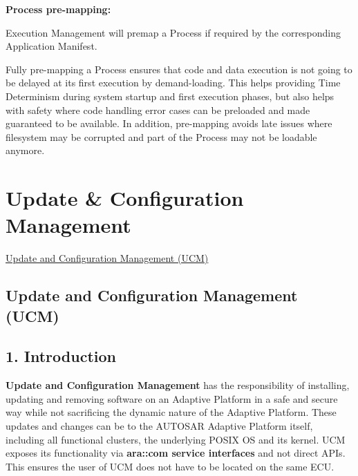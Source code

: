 \begin{DoxyItemize}
\begin{DoxyItemize}
\end{DoxyItemize}
\item {\bfseries Process pre-\/mapping\+:}
\begin{DoxyItemize}
\item Execution Management will premap a Process if required by the corresponding Application Manifest.
\item Fully pre-\/mapping a Process ensures that code and data execution is not going to be delayed at its first execution by demand-\/loading. This helps providing Time Determinism during system startup and first execution phases, but also helps with safety where code handling error cases can be preloaded and made guaranteed to be available. In addition, pre-\/mapping avoids late issues where filesystem may be corrupted and part of the Process may not be loadable anymore. 
\end{DoxyItemize}
\end{DoxyItemize}\hypertarget{adaptive_update_configurationmanagement}{}\section{Update \& Configuration Management}\label{adaptive_update_configurationmanagement}

\begin{DoxyItemize}
\item \hyperlink{ucm_overview}{Update and Configuration Management (U\+CM)} 
\end{DoxyItemize}\hypertarget{ucm_overview}{}\subsection{Update and Configuration Management (U\+CM)}\label{ucm_overview}
\subsection*{1. Introduction}

{\bfseries Update and Configuration Management} has the responsibility of installing, updating and removing software on an Adaptive Platform in a safe and secure way while not sacrificing the dynamic nature of the Adaptive Platform. These updates and changes can be to the A\+U\+T\+O\+S\+AR Adaptive Platform itself, including all functional clusters, the underlying P\+O\+S\+IX OS and its kernel. U\+CM exposes its functionality via {\bfseries ara\+::com service interfaces} and not direct A\+P\+Is. This ensures the user of U\+CM does not have to be located on the same E\+CU.

